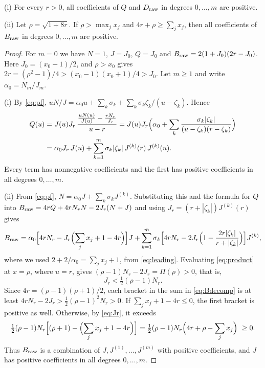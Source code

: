 \begin{theorem}\label{thm:positivity}
\textup{(i)} For every \(r>0\), all coefficients of \(Q\) and \(D_{\mathrm{raw}}\) in degrees
\(0,\dots,m\) are positive.

\textup{(ii)} Let \(\rho=\sqrt{1+8r}\). If \(\rho>\max_jx_j\) and
\(4r+\rho\ge\sum_jx_j\), then all coefficients of \(B_{\mathrm{raw}}\) in degrees \(0,\dots,m\) are
positive.
\end{theorem}
\begin{proof}
For \(m=0\) we have \(N=1\), \(J=J_0\), \(Q=J_0\) and \(B_{\mathrm{raw}}=2(1+J_0)(2r-J_0)\). Here
\(J_0=(x_0-1)/2\), and \(\rho>x_0\) gives \(2r=(\rho^2-1)/4>(x_0-1)(x_0+1)/4>J_0\). Let
\(m\ge1\) and write \(\alpha_0=N_m/J_m\).

(i) By \eqref{eq:pf}, \(uN/J=\alpha_0u+\sum_k\sigma_k+\sum_k\sigma_k\zeta_k/(u-\zeta_k)\). Hence
\begin{align*}
 Q(u)&=J(u)J_r\,\frac{\frac{uN(u)}{J(u)}-\frac{rN_r}{J_r}}{u-r}
 =J(u)J_r\Bigl(\alpha_0+\sum_k\frac{\sigma_k|\zeta_k|}{(u-\zeta_k)(r-\zeta_k)}\Bigr)\\
 &=\alpha_0J_r\,J(u)+\sum_{k=1}^m\sigma_k|\zeta_k|\,J^{(k)}(r)\,J^{(k)}(u).
\end{align*}
Every term has nonnegative coefficients and the first has positive coefficients in all
degrees \(0,\dots,m\).

(ii) From \eqref{eq:pf}, \(N=\alpha_0J+\sum_k\sigma_kJ^{(k)}\). Substituting this and the
formula for \(Q\) into \(B_{\mathrm{raw}}=4rQ+4rN_rN-2J_r(N+J)\) and using
\(J_r=(r+|\zeta_k|)J^{(k)}(r)\) gives
\begin{equation}\label{eq:Bdecomp}
 B_{\mathrm{raw}}=\alpha_0\Bigl[4rN_r-J_r\Bigl(\sum_jx_j+1-4r\Bigr)\Bigr]J
 +\sum_{k=1}^m\sigma_k\Bigl[4rN_r-2J_r\Bigl(1-\frac{2r|\zeta_k|}{r+|\zeta_k|}\Bigr)\Bigr]J^{(k)} ,
\end{equation}
where we used \(2+2/\alpha_0=\sum_jx_j+1\), from \eqref{eq:leading}. Evaluating
\eqref{eq:product} at \(x=\rho\), where \(u=r\), gives \((\rho-1)N_r-2J_r=\Pi(\rho)>0\), that is,
\begin{equation}\label{eq:Jr}
 J_r<\tfrac12(\rho-1)N_r .
\end{equation}
Since \(4r=(\rho-1)(\rho+1)/2\), each bracket in the sum in \eqref{eq:Bdecomp} is at least
\(4rN_r-2J_r>\tfrac12(\rho-1)^2N_r>0\). If \(\sum_jx_j+1-4r\le0\), the first bracket is
positive as well. Otherwise, by \eqref{eq:Jr}, it exceeds
\[
 \tfrac12(\rho-1)N_r\Bigl[(\rho+1)-\Bigl(\sum_jx_j+1-4r\Bigr)\Bigr]
 =\tfrac12(\rho-1)N_r\Bigl(4r+\rho-\sum_jx_j\Bigr)\ \ge0 .
\]
Thus \(B_{\mathrm{raw}}\) is a combination of \(J,J^{(1)},\dots,J^{(m)}\) with positive coefficients,
and \(J\) has positive coefficients in all degrees \(0,\dots,m\).
\end{proof}

